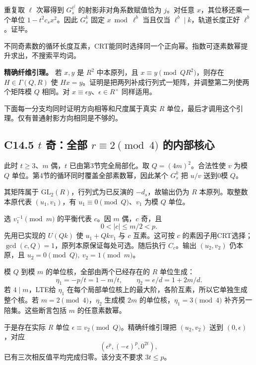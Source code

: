 {重复取} \(\ell\) {次幂得到} \(G_s^{\ell^j}\) {的射影非对角系数赋值恰为} \(j\){。对任意} \(x\){，其位移还乘一个单位} \(1-t^2c_sx^2\){。因此} \(G_s^k\) {固定} \(x\bmod\ell^b\) {当且仅当} \(\ell^b\mid k\){，轨道长度正好} \(\ell^b\){。证毕。}

{不同奇素数的循环长度互素，CRT能同时选择同一个正向幂。指数可逐素数幂提升求出，不搜索平均词。}

\textbf{{精确纤维引理。}} {若} \(x,y\) {是} \(R^2\) {中本原列，且} \(x\equiv y\pmod{QR^2}\){，则存在} \(H\in\Gamma(Q,R)\) {使} \(Hx=y\){。证明是把两列补成行列式一矩阵，并调整第二列使两个矩阵模} \(Q\) {相同。对} \(x\equiv\epsilon y\){、}\(\epsilon\in R^\times\) {同样适用。}

{下面每一分支均同时证明方向相等和尺度属于真实} \(R\) {单位，最后才调用这个引理。仅有普通射影方向相同是不够的。}

\subsection*{\texorpdfstring{{C14.5} \(t\) {奇：全部} \(r\equiv2\pmod4\) {的内部核心}}{C14.5 t 奇：全部 r\textbackslash equiv2\textbackslash pmod4 的内部核心}}\label{C14-h97}

{此时} \(t\ge3\){、}\(m\) {偶，}\(t\) {已由第3节完全局部化。取} \(Q=(4m)^2\){。合法性使} \(v\) {为模} \(Q\) {单位。第4节的循环同时覆盖全部素数幂，因此某个} \(G_s^k\) {把} \(u/v\) {送到0模} \(Q\){。}

{其矩阵属于} \(\mathrm{GL}_2(R)\){，行列式为已反演的} \(-d_s\){，故输出仍为} \(R\) {本原列。取整数本原代表} \((u_1,v_1)\){，有} \(u_1\equiv0\pmod Q\){、}\(v_1\) {为模} \(Q\) {单位。}

{选} \(v_1^{-1}\pmod m\) {的平衡代表} \(c\){。因} \(m\) {偶，}\(c\) {奇，且} \[
0<|c|\le m/2<p.
\] {先用已实现的} \(U(Qk)\) {使} \(u_1+Qkv_1\) {与} \(c\) {互素。这可按} \(c\) {的素因子用CRT选择；}\(\gcd(c,Q)=1\){，原列本原保证每处可选。随后执行} \(C_c\){。输出} \((u_2,v_2)\) {仍本原，且} \(u_2=0\pmod Q,\ v_2=1\pmod m\){。}

{模} \(Q\) {到模} \(m\) {的单位核，全部由两个已经存在的} \(R\) {单位生成：} \[
\eta_1=-p/t=1-m/t,\qquad \eta_2=e/d=1+2m/d.\tag{C14.9}
\] {若} \(4\mid m\){，LTE给} \(\eta_1\) {在每个局部单位核上的最大阶，各阶互素，所以它单独生成整个核。若} \(m=2\pmod4\){，}\(\eta_2\) {生成模} \(2m\) {的单位核，}\(\eta_1=3\pmod4\) {补齐另一陪集。这些断言包括} \(m\) {的任意素数幂。}

{于是存在实际} \(R\) {单位} \(\epsilon\equiv v_2\pmod Q\){。精确纤维引理把} \((u_2,v_2)\) {送到} \((0,\epsilon)\){，对应} \[
(\epsilon^p,(-\epsilon)^p,0^{2t}),
\] {已有三次相反值平均完成归零。该分支不要求} \(3t\le p\){。}

